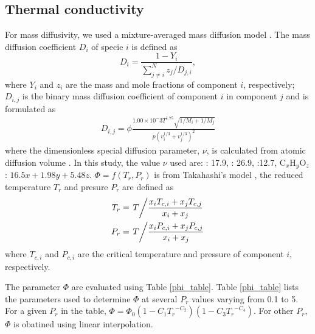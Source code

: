 \subsection{Thermal conductivity}
For mass diffusivity, we used a mixture-averaged mass diffusion model \cite{kee1996chemkin}. The mass diffusion coefficient $D_i$ of specie $i$ is defined as
\begin{equation}
D_i=\frac{1-Y_i}{\sum^N_{j\neq i}z_j/D_{j,i}},\label{massdiff}
\end{equation}
where $Y_i$ and $z_i$ are the mass and mole fractions of component $i$, respectively; $D_{i,j}$ is the binary mass diffusion coefficient of component $i$ in component $j$ and is formulated as 
\begin{align}
    D_{i,j} = \phi \frac{1.00\times 10^-3 T^{1.75}\sqrt{1/M_i+1/M_j}}{p\left(v_i^{1/3}+v_j^{1/3}\right)^2 }
\end{align}
where the dimensionless special diffusion parameter, $\nu$, is calculated from atomic diffusion volume \cite{fuller1966new}. In this study, the value $\nu$ used are: : 17.9, : 26.9, :12.7, $\text{C}_x\text{H}_y\text{O}_z$: $16.5x+1.98y+5.48z$. $\Phi=f(T_r,P_r)$ is from Takahashi’s model \cite{takahashi1975preparation}, the reduced temperature $T_r$ and presure $P_r$ are defined as 
\begin{align}
 T_r &= \left. T \middle/\frac{x_i T_{c,i} +x_j T_{c,j}}{x_i+x_j} \right. \\
 P_r &= \left. T \middle/\frac{x_i P_{c,i} +x_j P_{c,j}}{x_i+x_j} \right. \\
\end{align}
where $T_{c,i}$ and $P_{c,i}$ are the critical temperature and pressure of component $i$, respectively.

The parameter $\Phi$ are evaluated using Table \ref{phi_table}. Table \ref{phi_table} lists the parameters used to determine $\Phi$ at several $P_r$ values varying from 0.1 to 5. For a given $P_r$ in the table, $\Phi= \Phi_0\left(1-C_1{T_r}^{-C_2}\right)\left(1-C_3{T_r}^{-C_4}\right)$. For other $P_r$, $\Phi$ is obatined using linear interpolation. 

